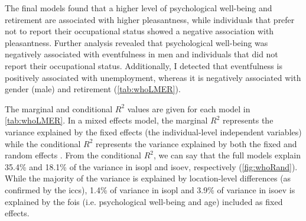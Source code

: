 The final models found that a higher level of psychological well-being and retirement are associated with higher pleasantness, while individuals that prefer not to report their occupational status showed a negative association with pleasantness. Further analysis revealed that psychological well-being was negatively associated with eventfulness in men and individuals that did not report their occupational status. Additionally, I detected that eventfulness is positively associated with unemployment, whereas it is negatively associated with gender (male) and retirement (\cref{tab:whoLMER}).

The marginal and conditional $R^2$ values are given for each model in \cref{tab:whoLMER}. In a mixed effects model, the marginal $R^2$ represents the variance explained by the fixed effects (the individual-level independent variables) while the conditional $R^2$ represents the variance explained by both the fixed and random effects \citep{Nakagawa2012general}. From the conditional $R^2$, we can say that the full models explain 35.4\% and 18.1\% of the variance in \gls{isopl} and \gls{isoev}, respectively (\cref{fig:whoRand}). While the majority of the variance is explained by location-level differences (as confirmed by the \glspl{icc}), 1.4\% of variance in \gls{isopl} and 3.9\% of variance in \gls{isoev} is explained by the \glspl{foi} (i.e. psychological well-being and age) included as fixed effects.

